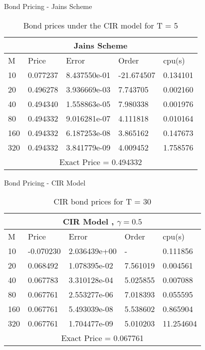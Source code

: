 \documentclass{beamer}
\begin{document}
\begin{frame}{Bond Pricing - Jains Scheme}
    \begin{table}[htp]
    \begin{tabular}{ |p{1cm}|p{1.7cm}|p{2.5cm}|p{2cm}|p{1.5cm}|  }
    
     \hline
     \multicolumn{5}{|c|}{Jains Scheme} \\
     \hline
     M & Price & Error & Order & cpu(s)\\
     \hline
     10 & 0.077237 & 8.437550e-01 & -21.674507 & 0.134101\\
    20 & 0.496278 & 3.936669e-03 & 7.743705 & 0.002160\\
    40 & 0.494340 & 1.558863e-05 & 7.980338 & 0.001976\\
    80 & 0.494332 & 9.016281e-07 & 4.111818 & 0.010164\\
    160 & 0.494332 & 6.187253e-08 & 3.865162 & 0.147673\\
    320 & 0.494332 & 3.841779e-09 & 4.009452 & 1.758576\\
     \hline
     \multicolumn{5}{|c|}{Exact Price = 0.494332} \\
     \hline
     
    \end{tabular}
    \caption{ Bond prices under the CIR model for T = 5}
    
    \end{table}
\end{frame}


\begin{frame}{Bond Pricing - CIR Model}
    \begin{table}[htp]
    \begin{tabular}{ |p{1cm}|p{1.7cm}|p{2.5cm}|p{2cm}|p{1.5cm}|  }
    
     \hline
     \multicolumn{5}{|c|}{CIR Model , $\gamma = 0.5$} \\
     \hline
     M & Price & Error & Order & cpu(s)\\
     \hline
     10 & -0.070230 & 2.036439e+00 &  - & 0.111856\\
    20 & 0.068492 & 1.078395e-02 &  7.561019 & 0.004561\\
    40 & 0.067783 & 3.310128e-04 &  5.025855 & 0.007088\\
    80 & 0.067761 & 2.553277e-06 &  7.018393 & 0.055595\\
    160 & 0.067761 & 5.493039e-08 &  5.538602 & 0.865904\\
    320 & 0.067761 & 1.704477e-09 &  5.010203 & 11.254604\\
     \hline
     \multicolumn{5}{|c|}{Exact Price = 0.067761} \\
     \hline
     
    \end{tabular}
    \caption{ CIR bond prices for T = 30}
    
    \end{table}
\end{frame}
 
\end{document}
